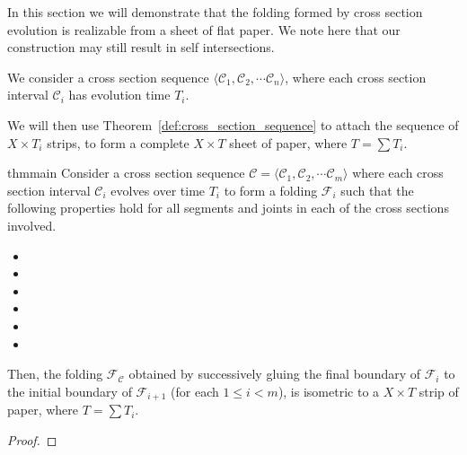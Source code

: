 In this section we will demonstrate that the folding formed by cross section evolution is realizable from a sheet of flat paper.
We note here that our construction may still result in self intersections.

We consider a cross section sequence $\langle \mathcal C_1, \mathcal C_2,\cdots \mathcal C_n \rangle$,
where each cross section interval $\mathcal C_i$ has evolution time $T_i$.

We will then use Theorem~\ref{def:cross_section_sequence} to attach the sequence of $X\times T_i$ strips,
to form a complete $X\times T$ sheet of paper, where $T = \sum T_i$.

\begin{restatable}{thm}{main}
\label{thm:main}
Consider a cross section sequence $\mathcal C = \langle \mathcal C_1, \mathcal C_2,\cdots \mathcal C_m \rangle$ where each
cross section interval $\mathcal C_i$ evolves over time $T_i$ to form a folding $\mathcal F_i$
such that the following properties hold for all segments and joints in each of the cross sections involved.
\begin{itemize}
    \item[] \vspace{-1.6em}\UniformVelocity*
    \item[] \vspace{-1.6em}\OrthogonalVelocity*
    \item[] \vspace{-1.6em}\JointOrthogonalVelocity*
    \item[] \vspace{-1.6em}\LeftRightPace*
    \item[] \vspace{-1.6em}\SegmentOrientation*
    \item[] \vspace{-1.6em}\JointVelocity*
\end{itemize}
Then, the folding $\mathcal F_{\mathcal C}$ obtained by successively gluing the final boundary of $\mathcal F_i$ to the initial boundary
of $\mathcal F_{i+1}$ (for each $1\le i<m$), is isometric to a $X\times T$ strip of paper, where $T = \sum T_i$.
\end{restatable}
\begin{proof}

\end{proof}
